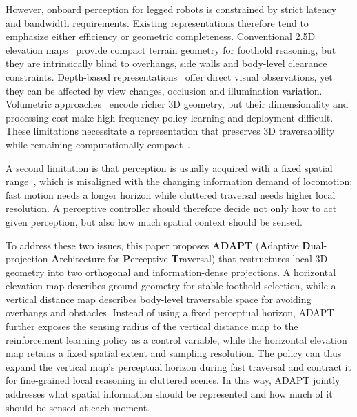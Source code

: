 \documentclass[letterpaper, 10 pt, conference]{ieeeconf/ieeeconf}
\DeclareRobustCommand{\RevisionAdd}[1]{{\color{red}#1}}
\begin{document}
However, onboard perception for legged robots is constrained by strict latency and bandwidth requirements. Existing representations therefore tend to emphasize either efficiency or geometric completeness. Conventional 2.5D elevation maps~\cite{Fankhauser2014RobotCentricElevationMapping,Fankhauser2018ProbabilisticTerrainMapping,ElevationMap_GPU_2022,long2025learning,wang2025beamdojo,ren2025vb,he2025attention,videomimic,Multi-Layer_ElevationMap_2025,Roth_2025_LearnedPerceptiveForwardDynamicsModel,Zhang_2026_AME2} provide compact terrain geometry for foothold reasoning, but they are intrinsically blind to overhangs, side walls and body-level clearance constraints. Depth-based representations~\cite{Li_2024_MOVE,zhuang2024humanoidRobot,zhuang2024humanoid,Yu_2025_START,Castillo_2025_LearningTerrainAwareBipedalLocomotion,Solano_2025_StandWalkNavigate,Sun_2025_DPL,Wang_2025_LocoMamba,zhu2026hiking} offer direct visual observations, yet they can be affected by view changes, occlusion and illumination variation. Volumetric approaches~\cite{Ben_2025_Gallant,Niijima_2025_Real-timeMulti-PlaneSegmentation,Wang_2025_Omni-Perception} encode richer 3D geometry, but their dimensionality and processing cost make high-frequency policy learning and deployment difficult. These limitations necessitate a representation that preserves 3D traversability while remaining computationally compact~\cite{2020arXiv200716100T,2018arXiv181205784L,2022arXiv220108117M}.

A second limitation is that perception is usually acquired with a fixed spatial range~\cite{Ben_2025_Gallant,Multi-Layer_ElevationMap_2025,long2025learning}, which is misaligned with the changing information demand of locomotion: fast motion needs a longer horizon while cluttered traversal needs higher local resolution. A perceptive controller should therefore decide not only how to act given perception, but also how much spatial context should be sensed.

To address these two issues, this paper proposes \textbf{ADAPT} (\textbf{A}daptive \textbf{D}ual-projection \textbf{A}rchitecture for \textbf{P}erceptive \textbf{T}raversal) that restructures local 3D geometry into two orthogonal and information-dense projections. A horizontal elevation map describes ground geometry for stable foothold selection, while a vertical distance map describes body-level traversable space for avoiding overhangs and obstacles. Instead of using a fixed perceptual horizon, ADAPT further exposes the sensing radius of the vertical distance map to the reinforcement learning policy as a control variable\RevisionAdd{, while the horizontal elevation map retains a fixed spatial extent and sampling resolution. The policy can thus expand the vertical map's} perceptual horizon during fast traversal and contract it for fine-grained local reasoning in cluttered scenes. In this way, ADAPT jointly addresses what spatial information should be represented and how much of it should be sensed at each moment.
\end{document}

